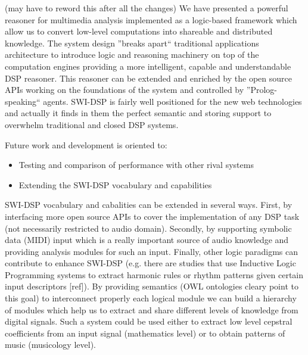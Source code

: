 \documentclass[runningheads]{llncs}
\begin{document}
(may have to reword this after all the changes)
We have presented a powerful reasoner for multimedia analysis implemented as a logic-based framework which allow us to convert low-level computations into shareable and distributed knowledge. The system design ''breaks apart`` traditional applications architecture to introduce logic and reasoning machinery on top of the computation engines providing a more intelligent, capable and understandable DSP reasoner. This reasoner can be extended and enriched by the open source APIs working on the foundations of the system and controlled by ''Prolog-speaking`` agents. SWI-DSP is fairly well positioned for the new web technologies and actually it finds in them the perfect semantic and storing support to overwhelm traditional and closed DSP systems.

Future work and development is oriented to:

\begin{itemize}
 \item Testing and comparison of performance with other rival systems
 \item Extending the SWI-DSP vocabulary and capabilities
\end{itemize}

SWI-DSP vocabulary and cabalities can be extended in several ways. First, by interfacing more open source APIs to cover the implementation of any DSP task (not necessarily restricted to audio domain). Secondly, by supporting symbolic data (MIDI) input which is a really important source of audio knowledge and providing analysis modules for such an input. Finally, other logic paradigms can contribute to enhance SWI-DSP (e.g. there are studies that use Inductive Logic Programming systems to extract harmonic rules or rhythm patterns given certain input descriptors [ref]). By providing semantics (OWL ontologies cleary point to this goal) to interconnect properly each logical module we can build a hierarchy of modules which help us to extract and share different levels of knowledge from digital signals. Such a system could be used either to extract low level cepstral coefficients from an input signal (mathematics level) or to obtain patterns of music (musicology level).
\end{document}
